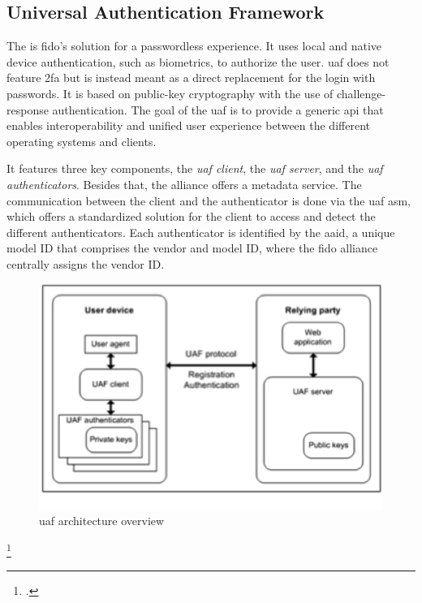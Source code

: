 \subsection{Universal Authentication Framework}

The  is \gls{fido}'s solution for a passwordless experience. It uses local and native device authentication, such as biometrics, to authorize the user. \gls{uaf} does not feature \gls{2fa} but is instead meant as a direct replacement for the login with passwords. It is based on public-key cryptography with the use of challenge-response authentication. The goal of the \gls{uaf} is to provide a generic \gls{api} that enables interoperability and unified user experience between the different operating systems and clients.

It features three key components, the \textit{\gls{uaf} client}, the \textit{\gls{uaf} server}, and the \textit{\gls{uaf} authenticators}. Besides that, the alliance offers a metadata service. The communication between the client and the authenticator is done via the \gls{uaf} \gls{asm}, which offers a standardized solution for the client to access and detect the different authenticators. Each authenticator is identified by the \gls{aaid}, a unique model ID that comprises the vendor and model ID, where the \gls{fido} alliance centrally assigns the vendor ID.

\begin{figure}[hbt]
	\centering
	\includegraphics[width=\textwidth]{pics/Picture1}
	\caption[\gls{uaf} architecture overview]{\gls{uaf} architecture overview\footnotemark}
	\label{fig:uaf_architecture}
\end{figure}
\footcitetext[Source: diagram by author, based on][4]{uaf-overview}


